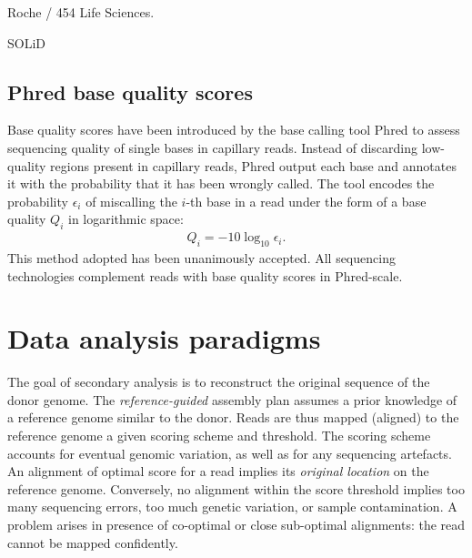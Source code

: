 Roche / 454 Life Sciences.

SOLiD

\subsection{Phred base quality scores}
\label{sec:background:hts:phred}

Base quality scores have been introduced by the base calling tool Phred \citep{Ewing1998, Ewing1998a} to assess sequencing quality of single bases in capillary reads.
Instead of discarding low-quality regions present in capillary reads, Phred output each base and annotates it with the probability that it has been wrongly called.
The tool encodes the probability $\epsilon_i$ of miscalling the $i$-th base in a read under the form of a base quality $Q_i$ in logarithmic space:
\begin{eqnarray}
\label{eq:phred}
Q_i = -10 \log_{10} \epsilon_i.
\end{eqnarray}
This method adopted has been unanimously accepted.
All sequencing technologies complement reads with base quality scores in Phred-scale.


\section{Data analysis paradigms}
\label{sec:paradigms}

The goal of secondary analysis is to reconstruct the original sequence of the donor genome.
The \emph{reference-guided} assembly plan assumes a prior knowledge of a reference genome similar to the donor.
Reads are thus mapped (\ie aligned) to the reference genome \wrt a given scoring scheme and threshold.
The scoring scheme accounts for eventual genomic variation, as well as for any sequencing artefacts.
An alignment of optimal score for a read implies its \emph{original location} on the reference genome.
Conversely, no alignment within the score threshold implies too many sequencing errors, too much genetic variation, or sample contamination.
A problem arises in presence of co-optimal or close sub-optimal alignments: the read cannot be mapped confidently.

